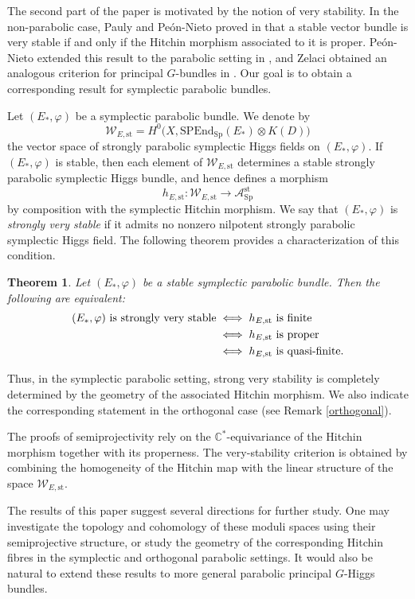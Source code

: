 \documentclass[11pt, reqno]{amsart}
\numberwithin{equation}{section}
\newcommand{\Sp}{\mathrm{Sp}}
\newcommand{\SPEnd}{\mathrm{SPEnd}}
\newtheorem{theorem}{Theorem}[section]
\theoremstyle{definition}
\begin{document}
The second part of the paper is motivated by the notion of very stability. In the non-parabolic case, Pauly and Pe\'on-Nieto proved in \cite{PP19} that a stable vector bundle is very stable if and only if the Hitchin morphism associated to it is proper. Pe\'on-Nieto extended this result to the parabolic setting in \cite{P24}, and Zelaci obtained an analogous criterion for principal $G$-bundles in \cite{Z20}. Our goal is to obtain a corresponding result for symplectic parabolic bundles.

Let $(E_*,\varphi)$ be a symplectic parabolic bundle. We denote by
\[
\mathcal{W}_{E,\mathrm{st}}
=
H^0\bigl(X,\SPEnd_{\Sp}(E_*)\otimes K(D)\bigr)
\]
the vector space of strongly parabolic symplectic Higgs fields on $(E_*,\varphi)$. If $(E_*,\varphi)$ is stable, then each element of $\mathcal{W}_{E,\mathrm{st}}$ determines a stable strongly parabolic symplectic Higgs bundle, and hence defines a morphism
\[
h_{E,\mathrm{st}}:\mathcal{W}_{E,\mathrm{st}}\longrightarrow \mathcal{A}^{\mathrm{st}}_{\Sp}
\]
by composition with the symplectic Hitchin morphism. We say that $(E_*,\varphi)$ is \textit{strongly very stable} if it admits no nonzero nilpotent strongly parabolic symplectic Higgs field. The following theorem provides a characterization of this condition.

\begin{theorem}
Let $(E_*,\varphi)$ be a stable symplectic parabolic bundle. Then the following are equivalent:
\begin{align*}
(E_*,\varphi)\ \textnormal{is strongly very stable}
&\iff h_{E,\mathrm{st}}\ \textnormal{is finite}\\
&\iff h_{E,\mathrm{st}}\ \textnormal{is proper}\\
&\iff h_{E,\mathrm{st}}\ \textnormal{is quasi-finite}.
\end{align*}
\end{theorem}

Thus, in the symplectic parabolic setting, strong very stability is completely determined by the geometry of the associated Hitchin morphism. We also indicate the corresponding statement in the orthogonal case (see Remark \ref{orthogonal}).

The proofs of semiprojectivity rely on the $\mathbb{C}^*$-equivariance of the Hitchin morphism together with its properness. The very-stability criterion is obtained by combining the homogeneity of the Hitchin map with the linear structure of the space $\mathcal{W}_{E,\mathrm{st}}$.

The results of this paper suggest several directions for further study. One may investigate the topology and cohomology of these moduli spaces using their semiprojective structure, or study the geometry of the corresponding Hitchin fibres in the symplectic and orthogonal parabolic settings. It would also be natural to extend these results to more general parabolic principal $G$-Higgs bundles.
\end{document}
